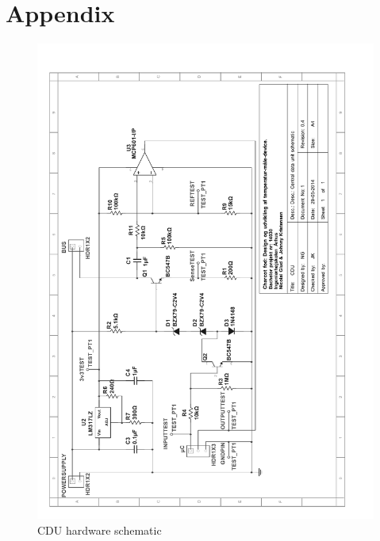 \chapter{Appendix}
\begin{figure}[H]
	\centering
	\includegraphics[width=.85\textwidth]{billeder/11projectdescription/CDU_schematic_rotated}
	\caption{CDU hardware schematic}
	\label{schematic:CDU}
\end{figure}
